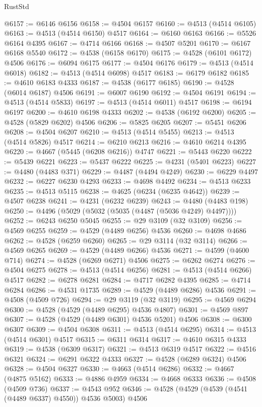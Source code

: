 \begin{lexlean}{RustStd}
\begin{coremodule}
@6157 := @6146 @6156
@6158 := @4504 @6157
@6160 := @4513 (@4514 @6105)
@6163 := @4513 (@4514 @6150) @4517
@6164 := @6160 @6163
@6166 := @5526 @6164 @4395
@6167 := @4714 @6166
@6168 := @4507 @5201
@6170 := @6167 @6168 @5540
@6172 := @4538 (@6158 @6170)
@6175 := @4528 (@6101 @6172) @4506
@6176 := @6094 @6175
@6177 := @4504 @6176
@6179 := @4513 (@4514 @6018)
@6182 := @4513 (@4514 @6098) @4517
@6183 := @6179 @6182
@6185 := @4610 @6183 @4333
@6187 := @4538 (@6177 @6185)
@6190 := @4528 (@6014 @6187) @4506
@6191 := @6007 @6190
@6192 := @4504 @6191
@6194 := @4513 (@4514 @5833)
@6197 := @4513 (@4514 @6011) @4517
@6198 := @6194 @6197
@6200 := @4610 @6198 @4333
@6202 := @4538 (@6192 @6200)
@6205 := @4528 (@5829 @6202) @4506
@6206 := @5825 @6205
@6207 := @5451 @6206
@6208 := @4504 @6207
@6210 := @4513 (@4514 @5455)
@6213 := @4513 (@4514 @5826) @4517
@6214 := @6210 @6213
@6216 := @4610 @6214 @4395
@6220 := @4667 (@5445 (@6208 @6216)) @4747
@6221 := @5443 @6220
@6222 := @5439 @6221
@6223 := @5437 @6222
@6225 := @4231 (@5401 @6223)
@6227 := @4480 (@4483 @371)
@6229 := @4487 (@4494 @4249)
@6230 := @6229 @4497
@6232 := @6227 @6230 @4293
@6233 := @4698 @4492
@6234 := @4513 @6233
@6235 := @4513 @5115
@6238 := @4625 (@6234 (@6235 @4642))
@6239 := @4507 @6238
@6241 := @4231 (@6232 @6239)
@6243 := @4480 (@4483 @198)
@6250 := @4496 (@5029 (@5032 (@5035 (@4487 (@5036 @4249) @4497))))
@6252 := @6243 @6250 @5045
@6255 := @29 @3109 (@32 @3109)
@6256 := @4569 @6255
@6259 := @4529 (@4489 @6256) @4536
@6260 := @4698 @4686
@6262 := @4528 (@6259 @6260)
@6265 := @29 @3114 (@32 @3114)
@6266 := @4569 @6265
@6269 := @4529 (@4489 @6266) @4536
@6271 := @4599 (@4600 @714)
@6274 := @4528 (@6269 @6271) @4506
@6275 := @6262 @6274
@6276 := @4504 @6275
@6278 := @4513 (@4514 @6256)
@6281 := @4513 (@4514 @6266) @4517
@6282 := @6278 @6281
@6284 := @4717 @6282 @4395
@6285 := @4714 @6284
@6286 := @4531 @1735
@6289 := @4529 (@4489 @6286) @4536
@6291 := @4508 (@4509 @726)
@6294 := @29 @3119 (@32 @3119)
@6295 := @4569 @6294
@6300 := @4528 (@4529 (@4489 @6295) @4536 @4807)
@6301 := @4569 @897
@6307 := @4528 (@4529 (@4489 @6301) @4536 @5201) @4506
@6308 := @6300 @6307
@6309 := @4504 @6308
@6311 := @4513 (@4514 @6295)
@6314 := @4513 (@4514 @6301) @4517
@6315 := @6311 @6314
@6317 := @4610 @6315 @4333
@6319 := @4538 (@6309 @6317)
@6321 := @4513 @6319 @4517
@6322 := @4516 @6321
@6324 := @6291 @6322 @4333
@6327 := @4528 (@6289 @6324) @4506
@6328 := @4504 @6327
@6330 := @4663 (@4514 @6286)
@6332 := @4667 (@4875 @5162)
@6333 := @4886 @4959
@6334 := @4668 @6333
@6336 := @4508 (@4509 @736)
@6337 := @4543 @952
@6346 := @4528 (@4529 (@4539 (@4541 (@4489 @6337) @4550)) @4536 @5003) @4506

\end{coremodule}
\end{lexlean}
